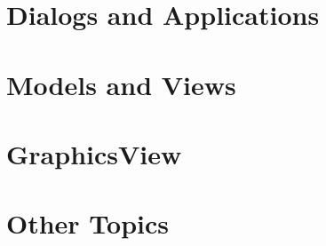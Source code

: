 \documentclass[t]{beamer}
\begin{document}
\part{Dialogs and Applications}



\part{Models and Views}



\part{GraphicsView}


%

\part{Other Topics}




\end{document}
